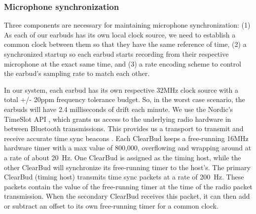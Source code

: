 \documentclass [11pt, proquest] {uwthesis}[2020/02/24]
\begin{document}




\subsubsection{Microphone synchronization} Three components are necessary for maintaining microphone synchronization: (1) As each of our earbuds has its own local clock source, we need to establish a common clock between them so that they have the same reference of time, (2) a synchronized startup so each earbud starts recording from their respective microphone at the exact same time, and (3) a rate encoding scheme to control the earbud's sampling rate to match each other. 

In our system, each earbud has its own respective 32MHz clock source with a total +/- 20ppm frequency tolerance budget. So, in the worst case scenario, the earbuds will have 2.4 milliseconds of drift each minute. We  use the  Nordic's TimeSlot API \cite{timeslot}, which grants us access to the underlying radio hardware in between Bluetooth transmissions. This provides us a transport to transmit and receive accurate time sync beacons \cite{wireless-timesync}. Each ClearBud keeps a free-running 16MHz hardware timer with a max value of 800,000, overflowing and wrapping around at a rate of about 20~Hz. One ClearBud is assigned as the timing host, while the other ClearBud will synchronize its free-running timer to the host's.  The primary ClearBud (timing host) transmits time sync packets at a rate of 200~Hz. These packets contain the value of the free-running timer at the time of the radio packet transmission. When the secondary ClearBud receives this packet, it can then add or subtract an offset to its own free-running timer for a common clock. %
\end{document}
